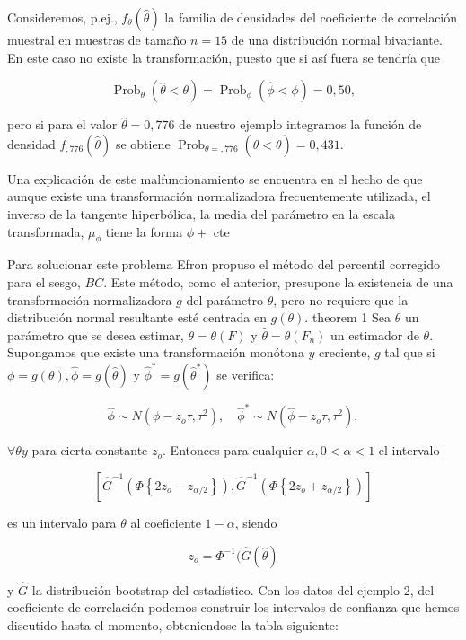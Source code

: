 \documentclass[
]{article}
\begin{document}
Consideremos, p.ej., \(f_{\theta}(\hat{\theta})\) la familia de densidades del coeficiente de correlación muestral en muestras de tamaño \(n=15\) de una distribución normal bivariante. En este caso no existe la transformación, puesto que si así fuera se tendría que

\[
\operatorname{Prob}_{\theta}(\hat{\theta}<\theta)=\operatorname{Prob}_{\phi}(\hat{\phi}<\phi)=0,50,
\]

pero si para el valor \(\hat{\theta}=0,776\) de nuestro ejemplo integramos la función de densidad \(f_{, 776}(\hat{\theta})\) se obtiene \(\operatorname{Prob}_{\theta=, 776}(\hat{\theta}<\theta)=0,431\).

Una explicación de este malfuncionamiento se encuentra en el hecho de que aunque existe una transformación normalizadora frecuentemente utilizada, el inverso de la tangente hiperbólica, la media del parámetro en la escala transformada, \(\mu_{\phi}\) tiene la forma \(\phi+\) cte

Para solucionar este problema Efron propuso el método del percentil corregido para el sesgo, \(B C\). Este método, como el anterior, presupone la existencia de una transformación normalizadora \(g\) del parámetro \(\theta\), pero no requiere que la distribución normal resultante esté centrada en \(g(\theta)\).
theorem 1 Sea \(\theta\) un parámetro que se desea estimar, \(\theta=\theta(F)\) y \(\hat{\theta}=\theta\left(F_{n}\right)\) un estimador de \(\theta\). Supongamos que existe una transformación monótona \(y\) creciente, \(g\) tal que si \(\phi=g(\theta), \hat{\phi}=g(\hat{\theta})\) y \(\hat{\phi}^{*}=g\left(\hat{\theta}^{*}\right)\) se verifica:

\[
\hat{\phi} \sim N\left(\phi-z_{o} \tau, \tau^{2}\right), \quad \hat{\phi}^{*} \sim N\left(\hat{\phi}-z_{o} \tau, \tau^{2}\right),
\]

\(\forall \theta y\) para cierta constante \(z_{o}\). Entonces para cualquier \(\alpha, 0<\alpha<1\) el intervalo

\[
\left[\hat{G}^{-1}\left(\Phi\left\{2 z_{o}-z_{\alpha / 2}\right\}\right), \hat{G}^{-1}\left(\Phi\left\{2 z_{o}+z_{\alpha / 2}\right\}\right)\right]
\]

es un intervalo para \(\theta\) al coeficiente \(1-\alpha\), siendo

\[
z_{o}=\Phi^{-1}(\hat{G}(\hat{\theta})
\]

y \(\hat{G}\) la distribución bootstrap del estadístico.
Con los datos del ejemplo 2, del coeficiente de correlación podemos construir los intervalos de confianza que hemos discutido hasta el momento, obteniendose la tabla siguiente:
\end{document}
